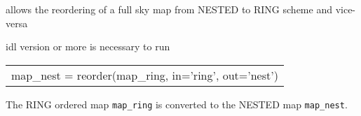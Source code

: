 \begin{codedescription}
{\facname allows the reordering of a full sky map from NESTED to RING
scheme and vice-versa}
\end{codedescription}



\begin{related}
  \begin{sulist}{} %
  \item[idl] version \idlversion or more is necessary to run \facname
  \end{sulist}
\end{related}


\begin{example}
{
\begin{tabular}{l} %
map\_nest = reorder(map\_ring, in='ring', out='nest') \\
\end{tabular}
}
{The RING ordered map {\tt map\_ring} is converted to the 
NESTED map {\tt map\_nest}.
}
\end{example}


